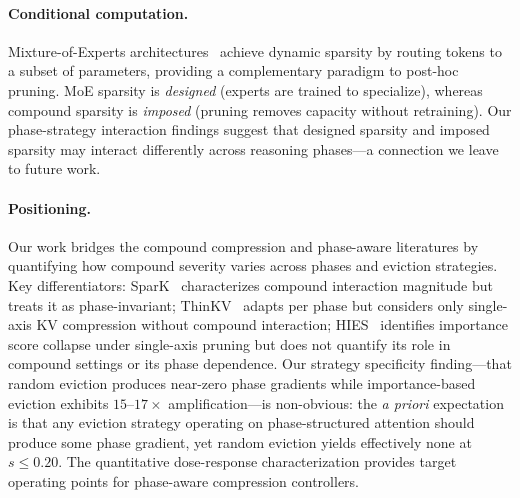 \paragraph{Conditional computation.}
Mixture-of-Experts architectures~\cite{shazeer-2017-moe, fedus-jmlr2022} achieve dynamic sparsity by routing tokens to a subset of parameters, providing a complementary paradigm to post-hoc pruning.
MoE sparsity is \emph{designed} (experts are trained to specialize), whereas compound sparsity is \emph{imposed} (pruning removes capacity without retraining).
Our phase-strategy interaction findings suggest that designed sparsity and imposed sparsity may interact differently across reasoning phases---a connection we leave to future work.

\paragraph{Positioning.}
Our work bridges the compound compression and phase-aware literatures by quantifying how compound severity varies across phases and eviction strategies. Key differentiators: SparK~\cite{spark-aaai2026} characterizes compound interaction magnitude but treats it as phase-invariant; ThinKV~\cite{thinkv-iclr2026} adapts per phase but considers only single-axis KV compression without compound interaction; HIES~\cite{hies-2025} identifies importance score collapse under single-axis pruning but does not quantify its role in compound settings or its phase dependence. Our strategy specificity finding---that random eviction produces near-zero phase gradients while importance-based eviction exhibits $15$--$17{\times}$ amplification---is non-obvious: the \emph{a priori} expectation is that any eviction strategy operating on phase-structured attention should produce some phase gradient, yet random eviction yields effectively none at $s \leq 0.20$. The quantitative dose-response characterization provides target operating points for phase-aware compression controllers.
